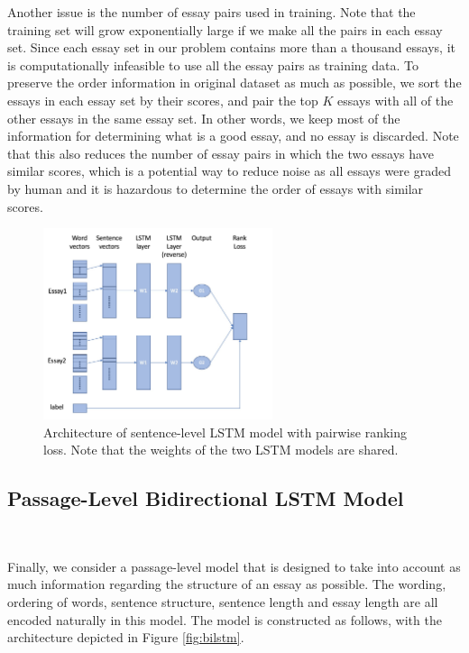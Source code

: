 \documentclass[10pt,psamsfonts]{amsart}
\theoremstyle{definition}
\theoremstyle{remark}
\numberwithin{equation}{section}
\begin{document}
Another issue is the number of essay pairs used in training. Note that the training set will grow exponentially large if we make all the pairs in each essay set. Since each essay set in our problem contains more than a thousand essays, it is computationally infeasible to use all the essay pairs as training data. To preserve the order information in original dataset as much as possible, we sort the essays in each essay set by their scores, and pair the top $K$ essays with all of the other essays in the same essay set. In other words, we keep most of the information for determining what is a good essay, and no essay is discarded. Note that this also reduces the number of essay pairs in which the two essays have similar scores, which is a potential way to reduce noise as all essays were graded by human and it is hazardous to determine the order of essays with similar scores.

\begin{figure}
	\includegraphics[width=0.6\textwidth]{rankmodel.jpg}
	\caption{Architecture of sentence-level LSTM model with pairwise ranking loss. Note that the weights of the two LSTM models are shared.}
	\label{fig:rankmodel}
\end{figure}

\subsection*{Passage-Level Bidirectional LSTM Model}\hfill\\
\vskip -0.1in

Finally, we consider a passage-level model that is designed to take into account as much information regarding the structure of an essay as possible. The wording, ordering of words, sentence structure, sentence length and essay length are all encoded naturally in this model. The model is constructed as follows, with the architecture depicted in Figure \ref{fig:bilstm}.
\end{document}
